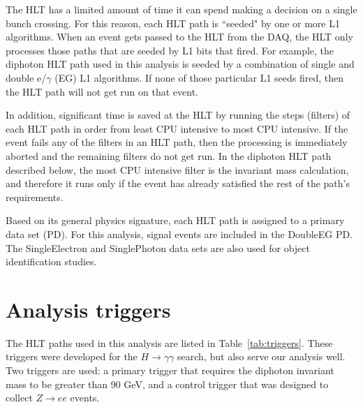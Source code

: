 The HLT has a limited amount of time it can spend making a decision on a single bunch crossing. For this reason, each HLT path is ``seeded" by one or more L1 algorithms. When an event gets passed to the HLT from the DAQ, the HLT only processes those paths that are seeded by L1 bits that fired. 
For example, the diphoton HLT path used in this analysis is seeded by a combination of single and double e/$\gamma$ (EG) L1 algorithms. If none of those particular L1 seeds fired, then the HLT path will not get run on that event. 

In addition, significant time is saved at the HLT by running the steps (filters) of each HLT path in order from least CPU intensive to most CPU intensive. If the event fails any of the filters in an HLT path, then the processing is immediately aborted and the remaining filters do not get run. In the diphoton HLT path described below, the most CPU intensive filter is the invariant mass calculation, and therefore it runs only if the event has already satisfied the rest of the path's requirements.

Based on its general physics signature, each HLT path is assigned to a primary data set (PD). For this analysis, signal events are included in the DoubleEG PD. The SingleElectron and SinglePhoton data sets are also used for object identification studies.


\section{Analysis triggers}
\label{sec:analysisTrig}

The HLT paths used in this analysis are listed in Table~\ref{tab:triggers}. These triggers were developed for the $H \rightarrow \gamma\gamma$ search, 
but also serve our analysis well. Two triggers are used: a primary trigger that requires the diphoton invariant mass to be greater than 90 GeV, and a control
trigger that was designed to collect $Z\rightarrow ee$ events. 

